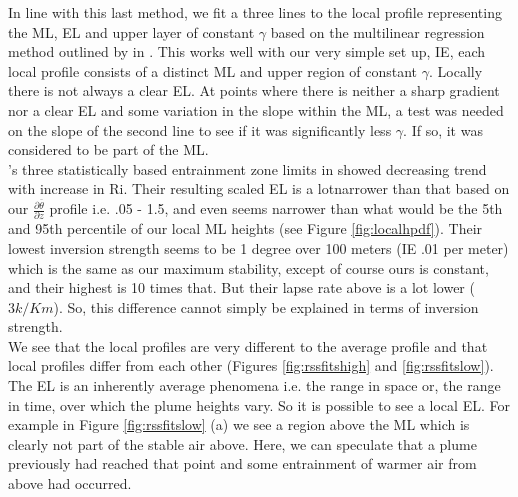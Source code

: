 In line with this last method, we fit a three lines to the local profile representing the \acs{ML}, 
\acs{EL} and upper layer of constant $\gamma$ based on the multilinear regression method outlined by \citeauthor{Vieth} in 
\cite{Vieth}.  This works well with our very simple set up, IE, each local profile consists
of a distinct \acs{ML} and upper region of constant $\gamma$. Locally there is not always
a clear \acs{EL}.  At points where there is neither a sharp gradient nor a clear \acs{EL} 
and some variation in the slope within the \acs{ML}, a test was needed on the slope of 
the second line to see if it was significantly less $\gamma$.  If so, it was considered
to be part of the \acs{ML}.\\

\citeauthor{BrooksFowler2}'s three statistically based entrainment zone limits in 
\cite{BrooksFowler2} showed decreasing trend with increase in \acs{Ri}. Their resulting
scaled \acs{EL} is a lotnarrower than that based on our $\frac{\partial \overline{\theta}}{\partial z}$ profile i.e. .05 - 1.5, and even seems narrower than
what would be the 5th and 95th percentile of our local \acs{ML} heights (see Figure \ref{fig:localhpdf}).  Their lowest
inversion strength seems to be 1 degree over 100 meters (IE .01 per meter) which is
the same as our maximum stability, except of course ours is constant, and their highest is
10 times that. But their lapse rate above is a lot lower ($3k/Km$).  So, this difference cannot simply be explained in terms of inversion strength.\\  %

We see that the local profiles are very different to the average profile and that local
profiles differ from each other (Figures \ref{fig:rssfitshigh} and \ref{fig:rssfitslow}).  The \acs{EL} is an inherently average phenomena i.e.
the range in space or, the range in time, over which the plume heights vary.  So
it is possible to see a local \acs{EL}.  For example in Figure \ref{fig:rssfitslow} (a)
we see a region above the \acs{ML} which is clearly not part of the stable
air above.  Here, we can speculate that a plume previously had reached that point
and some entrainment of warmer air from above had occurred.\\
 
